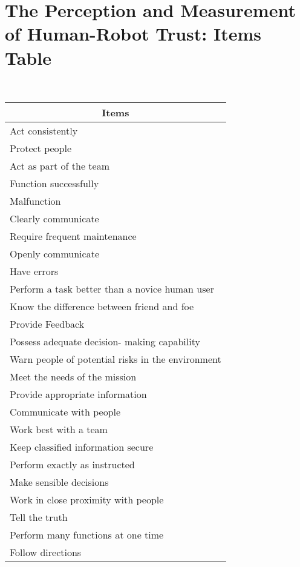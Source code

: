 \chapter{The Perception and Measurement of Human-Robot Trust: Items Table}
\label{app:measurement.items.table}
\
\begin{longtable}{l}
    \multicolumn{1}{c}{\textbf{Items}} \\ \hline
    \endhead
    Act consistently  \\ \hline
    Protect people \\ \hline
    Act as part of the team \\ \hline
    Function successfully \\ \hline
    Malfunction \\ \hline
    Clearly communicate \\ \hline
    Require frequent maintenance \\ \hline
    Openly communicate \\ \hline
    Have errors \\ \hline
    Perform a task better than a novice human user \\ \hline
    Know the difference between friend and foe \\ \hline
    Provide Feedback \\ \hline
    Possess adequate decision- making capability \\ \hline
    Warn people of potential risks in the environment \\ \hline
    Meet the needs of the mission \\ \hline
    Provide appropriate information \\ \hline
    Communicate with people \\ \hline
    Work best with a team \\ \hline
    Keep classified information secure \\ \hline
    Perform exactly as instructed \\ \hline
    Make sensible decisions \\ \hline
    Work in close proximity with people \\ \hline
    Tell the truth \\ \hline
    Perform many functions at one time \\ \hline
    Follow directions \\ \hline

\end{longtable}
